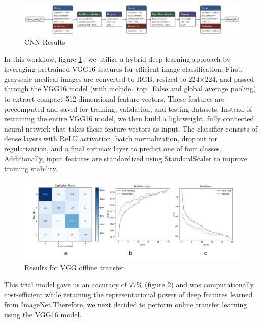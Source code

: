 \documentclass{article}
\begin{document}
\begin{figure}[h!] %
    \centering
    \includegraphics[width=1.0\linewidth]{vgg16_model1.keras(1).png}
    \caption{CNN Results}
    \label{fig:vgg16offlinemodel.png}
\end{figure}
In this workflow, figure \ref{fig:vgg16offlinemodel.png}., we utilize a hybrid deep learning approach by leveraging pretrained VGG16 features for efficient image classification. First, grayscale medical images are converted to RGB, resized to 224×224, and passed through the VGG16 model (with include\_top=False and global average pooling) to extract compact 512-dimensional feature vectors. These features are precomputed and saved for training, validation, and testing datasets. Instead of retraining the entire VGG16 model, we then build a lightweight, fully connected neural network that takes these feature vectors as input. The classifier consists of dense layers with ReLU activation, batch normalization, dropout for regularization, and a final softmax layer to predict one of four classes. Additionally, input features are standardized using StandardScaler to improve training stability.

\begin{figure}[h!] %
    \centering
    \includegraphics[width=1.0\linewidth]{vgg16_offlinetransfer.png}
    \caption{Results for VGG offline transfer}
    \label{fig:vgg16offlineresults.png}
\end{figure}

This trial model gave us an accuracy of 77\% (figure \ref{fig:vgg16offlineresults.png}) and was computationally cost-efficient while retaining the representational power of deep features learned from ImageNet.Therefore, we next decided to perform online transfer learning using the VGG16 model.
\end{document}
